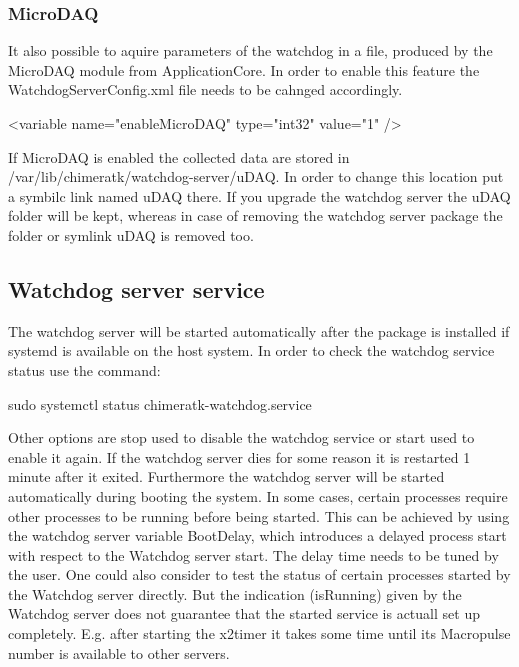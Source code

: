 \subsubsection*{Micro\+D\+AQ}

It also possible to aquire parameters of the watchdog in a file, produced by the {\ttfamily Micro\+D\+AQ} module from {\ttfamily Application\+Core}. In order to enable this feature the {\ttfamily Watchdog\+Server\+Config.\+xml} file needs to be cahnged accordingly. \begin{DoxyVerb}<variable name="enableMicroDAQ" type="int32" value="1" />
\end{DoxyVerb}


If Micro\+D\+AQ is enabled the collected data are stored in {\ttfamily /var/lib/chimeratk/watchdog-\/server/u\+D\+AQ}. In order to change this location put a symbilc link named {\ttfamily u\+D\+AQ} there. If you upgrade the watchdog server the u\+D\+AQ folder will be kept, whereas in case of removing the watchdog server package the folder or symlink {\ttfamily u\+D\+AQ} is removed too.

\subsection*{Watchdog server service}

The watchdog server will be started automatically after the package is installed if systemd is available on the host system. In order to check the watchdog service status use the command\+: \begin{DoxyVerb}sudo systemctl status chimeratk-watchdog.service
\end{DoxyVerb}


Other options are {\ttfamily stop} used to disable the watchdog service or {\ttfamily start} used to enable it again. If the watchdog server dies for some reason it is restarted 1 minute after it exited. Furthermore the watchdog server will be started automatically during booting the system. In some cases, certain processes require other processes to be running before being started. This can be achieved by using the watchdog server variable {\ttfamily Boot\+Delay}, which introduces a delayed process start with respect to the Watchdog server start. The delay time needs to be tuned by the user. One could also consider to test the status of certain processes started by the Watchdog server directly. But the indication ({\ttfamily is\+Running}) given by the Watchdog server does not guarantee that the started service is actuall set up completely. E.\+g. after starting the x2timer it takes some time until its Macropulse number is available to other servers.

